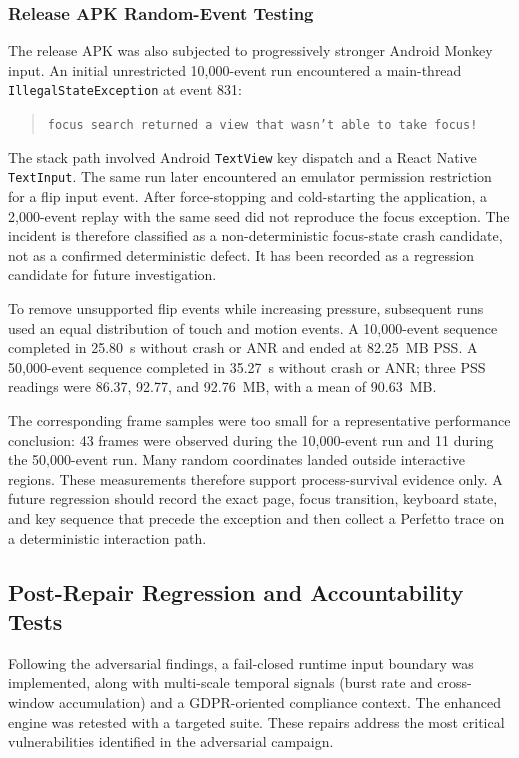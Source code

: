 \subsubsection{Release APK Random-Event Testing}

The release APK was also subjected to progressively stronger Android Monkey input. An initial unrestricted 10,000-event run encountered a main-thread
\texttt{IllegalStateException} at event 831:

\begin{quote}
\texttt{focus search returned a view that wasn't able to take focus!}
\end{quote}

The stack path involved Android \texttt{TextView} key dispatch and a React Native \texttt{TextInput}. The same run later encountered an emulator permission restriction for a flip input event. After force-stopping and cold-starting the application, a 2,000-event replay with the same seed did not reproduce the focus exception. The incident is therefore classified as a non-deterministic focus-state crash candidate, not as a confirmed deterministic defect. It has been recorded as a regression candidate for future investigation.

To remove unsupported flip events while increasing pressure, subsequent runs used an equal distribution of touch and motion events. A 10,000-event sequence completed in 25.80~s without crash or ANR and ended at 82.25~MB PSS. A 50,000-event sequence completed in 35.27~s without crash or ANR; three PSS readings were 86.37, 92.77, and 92.76~MB, with a mean of 90.63~MB.

The corresponding frame samples were too small for a representative performance conclusion: 43 frames were observed during the 10,000-event run and 11 during the 50,000-event run. Many random coordinates landed outside interactive regions. These measurements therefore support process-survival evidence only. A future regression should record the exact page, focus transition, keyboard state, and key sequence that precede the exception and then collect a Perfetto trace on a deterministic interaction path.

\subsection{Post-Repair Regression and Accountability Tests}

Following the adversarial findings, a fail-closed runtime input boundary was implemented, along with multi-scale temporal signals (burst rate and cross-window accumulation) and a GDPR-oriented compliance context. The enhanced engine was retested with a targeted suite. These repairs address the most critical vulnerabilities identified in the adversarial campaign.

